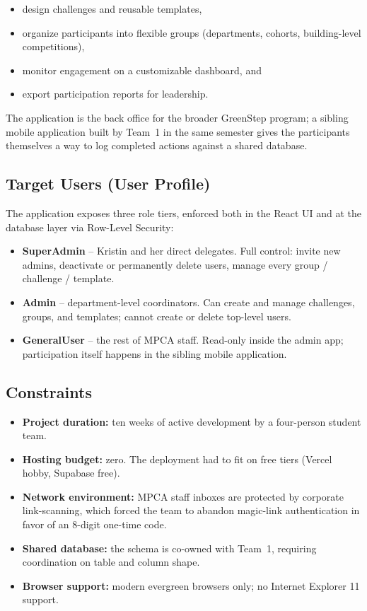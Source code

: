 \documentclass[11pt,letterpaper]{article}
\begin{document}
\begin{itemize}[noitemsep]
  \item design challenges and reusable templates,
  \item organize participants into flexible groups (departments, cohorts,
        building-level competitions),
  \item monitor engagement on a customizable dashboard, and
  \item export participation reports for leadership.
\end{itemize}

The application is the back office for the broader GreenStep program; a
sibling mobile application built by Team~1 in the same semester gives the
participants themselves a way to log completed actions against a shared
database.

\subsection{Target Users (User Profile)}

The application exposes three role tiers, enforced both in the React UI
and at the database layer via Row-Level Security:

\begin{itemize}
  \item \textbf{SuperAdmin} -- Kristin and her direct delegates. Full
        control: invite new admins, deactivate or permanently delete users,
        manage every group / challenge / template.
  \item \textbf{Admin} -- department-level coordinators. Can create and
        manage challenges, groups, and templates; cannot create or delete
        top-level users.
  \item \textbf{GeneralUser} -- the rest of MPCA staff. Read-only inside
        the admin app; participation itself happens in the sibling mobile
        application.
\end{itemize}

\subsection{Constraints}

\begin{itemize}[noitemsep]
  \item \textbf{Project duration:} ten weeks of active development by a
        four-person student team.
  \item \textbf{Hosting budget:} zero. The deployment had to fit on free
        tiers (Vercel hobby, Supabase free).
  \item \textbf{Network environment:} MPCA staff inboxes are protected by
        corporate link-scanning, which forced the team to abandon
        magic-link authentication in favor of an 8-digit one-time code.
  \item \textbf{Shared database:} the schema is co-owned with Team~1,
        requiring coordination on table and column shape.
  \item \textbf{Browser support:} modern evergreen browsers only; no
        Internet Explorer 11 support.
\end{itemize}
\end{document}
